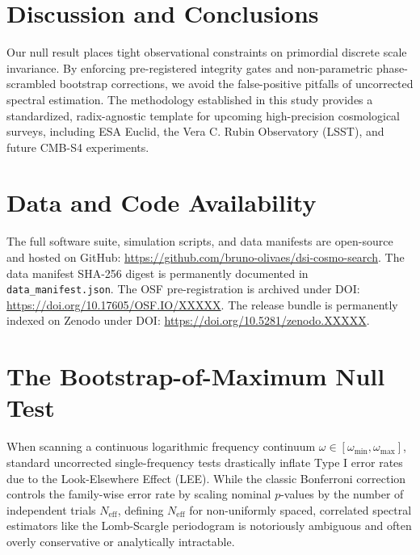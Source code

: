 \documentclass[10pt,twocolumn,a4paper]{article}
\begin{document}
\section{Discussion and Conclusions}
Our null result places tight observational constraints on primordial discrete scale invariance. By enforcing pre-registered integrity gates and non-parametric phase-scrambled bootstrap corrections, we avoid the false-positive pitfalls of uncorrected spectral estimation. The methodology established in this study provides a standardized, radix-agnostic template for upcoming high-precision cosmological surveys, including ESA Euclid, the Vera C. Rubin Observatory (LSST), and future CMB-S4 experiments.

\section*{Data and Code Availability}
The full software suite, simulation scripts, and data manifests are open-source and hosted on GitHub: \url{https://github.com/bruno-olivaes/dsi-cosmo-search}. The data manifest SHA-256 digest is permanently documented in \texttt{data\_manifest.json}. The OSF pre-registration is archived under DOI: \url{https://doi.org/10.17605/OSF.IO/XXXXX}. The release bundle is permanently indexed on Zenodo under DOI: \url{https://doi.org/10.5281/zenodo.XXXXX}.

\appendix

\section{The Bootstrap-of-Maximum Null Test}
When scanning a continuous logarithmic frequency continuum $\omega \in [\omega_{\min}, \omega_{\max}]$, standard uncorrected single-frequency tests drastically inflate Type I error rates due to the Look-Elsewhere Effect (LEE). While the classic Bonferroni correction controls the family-wise error rate by scaling nominal $p$-values by the number of independent trials $N_{\mathrm{eff}}$, defining $N_{\mathrm{eff}}$ for non-uniformly spaced, correlated spectral estimators like the Lomb-Scargle periodogram is notoriously ambiguous and often overly conservative or analytically intractable.
\end{document}
